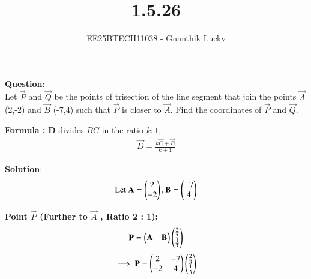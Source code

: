 \documentclass[journal]{IEEEtran}
\begin{document}

\vspace{3cm}

\title{1.5.26}
\author{EE25BTECH11038 - Gnanthik Lucky}
{\let\newpage\relax\maketitle}

\renewcommand{\thefigure}{\theenumi}
\renewcommand{\thetable}{\theenumi}
\setlength{\intextsep}{10pt} %
\textbf{Question}:\\
Let  $\vec{P}$ and $\vec{Q}$ be the points of trisection of the line segment that join the points  $\vec{A}$ (2,-2) and  $\vec{B}$ (-7,4) such that  $\vec{P}$ is closer to  $\vec{A}$. Find the coordinates of  $\vec{P}$ and  $\vec{Q}$.
\bigskip

\textbf{Formula :}   
\textbf{D} divides $BC$ in the ratio $k : 1$, 
\begin{align}
        \vec{D} = \frac{k\vec{C} + \vec{B}}{k + 1}
\end{align}
    


\textbf{Solution}:\\

\begin{align}
\text{Let } 
\mathbf{A} = \begin{pmatrix} 2 \\ -2 \end{pmatrix},
\mathbf{B} = \begin{pmatrix} -7 \\ 4 \end{pmatrix}
\end{align}


\textbf{Point  $\vec{P}$  (Further to  $\vec{A}$ , Ratio 2 : 1):}
\begin{align}
    \vec{P}=\begin{myvec}{\vec{A}& \vec{B}}\end{myvec}\begin{myvec}
        {\frac{2}{3}\\\frac{1}{3}}\end{myvec}    
\end{align}
\begin{align}
\implies \vec{P}=\begin{myvec}{ 2 & -7\\ -2 & 4 }\end{myvec}\begin{myvec}
        {\frac{2}{3}\\\frac{1}{3}}\end{myvec}
\end{align}
 
\end{document}
